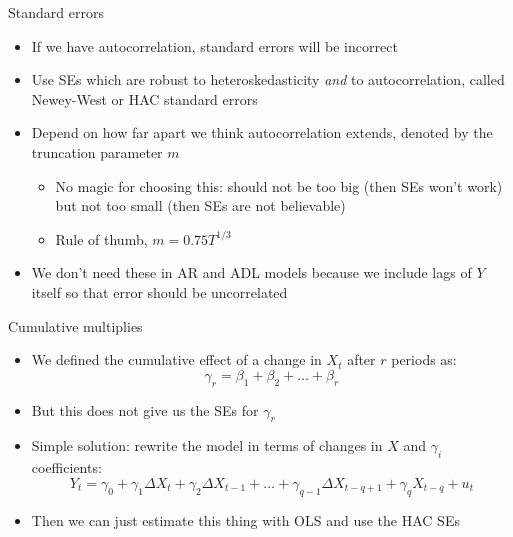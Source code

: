 \documentclass[aspectratio=169]{beamer}
\begin{document}
\begin{frame}{Standard errors}
    \begin{itemize}
        \item If we have autocorrelation, standard errors will be incorrect
        \item Use SEs which are robust to heteroskedasticity \textit{and} to autocorrelation, called Newey-West or HAC standard errors
        \item Depend on how far apart we think autocorrelation extends, denoted by the truncation parameter $m$
        \begin{itemize}
            \item No magic for choosing this: should not be too big (then SEs won't work) but not too small (then SEs are not believable)
            \item Rule of thumb, $m = 0.75T^{1/3}$
        \end{itemize}
        \item We don't need these in AR and ADL models because we include lags of $Y$ itself so that error should be uncorrelated
    \end{itemize}
\end{frame}

\begin{frame}{Cumulative multiplies}
    \begin{itemize}
        \item We defined the cumulative effect of a change in $X_t$ after $r$ periods as:
        $$
        \gamma_r = \beta_1 + \beta_2 + \dots + \beta_r
        $$
        \item But this does not give us the SEs for $\gamma_r$
        \item Simple solution: rewrite the model in terms of changes in $X$ and $\gamma_i$ coefficients:
        $$
        Y_t=\gamma_0+\gamma_1 \Delta X_t+\gamma_2 \Delta X_{t-1}+\ldots+\gamma_{q-1} \Delta X_{t-q+1}+\gamma_q X_{t-q}+u_t
        $$
        \item Then we can just estimate this thing with OLS and use the HAC SEs
    \end{itemize}
\end{frame}
\end{document}
